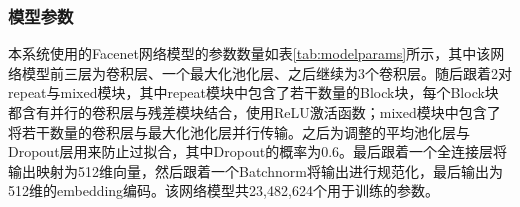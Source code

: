 

\subsubsection{模型参数}

本系统使用的Facenet网络模型的参数数量如表\ref{tab:modelparams}所示，其中该网络模型前三层为卷积层、一个最大化池化层、之后继续为3个卷积层。随后跟着2对repeat与mixed模块，其中repeat模块中包含了若干数量的Block块，每个Block块都含有并行的卷积层与残差模块结合，使用ReLU激活函数；mixed模块中包含了将若干数量的卷积层与最大化池化层并行传输。之后为调整的平均池化层与Dropout层用来防止过拟合，其中Dropout的概率为0.6。最后跟着一个全连接层将输出映射为512维向量，然后跟着一个Batchnorm将输出进行规范化，最后输出为512维的embedding编码。该网络模型共23,482,624个用于训练的参数。

